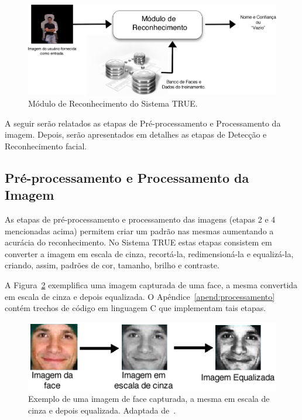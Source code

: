 		\begin{figure}[htb]
			\begin{center}
				\includegraphics[scale=2.0]{figuras/4.ProblemaEProposta/reconhecimento-simples.png}
			\end{center}
			\caption{Módulo de Reconhecimento do Sistema TRUE.}
			\label{fig:processo-reconhecimento}
		\end{figure}


	A seguir serão relatados as etapas de Pré-processamento e Processamento da imagem. Depois, serão apresentados em detalhes as etapas de Detecção e Reconhecimento facial.

	\subsection{Pré-processamento e Processamento da Imagem}
		
		As etapas de pré-processamento e processamento das imagens (etapas 2 e 4 mencionadas acima) permitem criar um padrão nas mesmas aumentando a acurácia do reconhecimento. No Sistema TRUE estas etapas consistem em converter a imagem em escala de cinza, recortá-la, redimensioná-la e equalizá-la, criando, assim, padrões de cor, tamanho, brilho e contraste.

		A Figura~\ref{fig:greyscale} exemplifica uma imagem capturada de uma face, a mesma convertida em escala de cinza e depois equalizada. O
		Apêndice~\ref{apend:processamento} contém trechos de código em linguagem C que implementam tais etapas.

		\begin{figure}[htb]
			\begin{center}
				\includegraphics[scale=0.7]{figuras/4.ProblemaEProposta/greyscale.png}
			\end{center}
			\caption{Exemplo de uma imagem de face capturada, a mesma em escala de cinza e depois equalizada. Adaptada de~\cite{shervin}.}
			\label{fig:greyscale}
		\end{figure}

